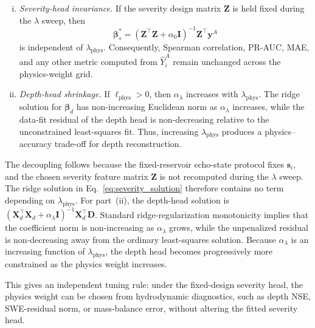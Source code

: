 \documentclass[pdflatex,sn-mathphys-ay]{sn-jnl}
\theoremstyle{thmstyleone}
\begin{document}
\begin{enumerate}[(i)]
  \item \emph{Severity-head invariance.}  If the severity design matrix
        $\mathbf{Z}$ is held fixed during the $\lambda$ sweep, then
        \begin{equation}
          \boldsymbol{\beta}_{s}^{*}
          =
          (\mathbf{Z}^{\top}\mathbf{Z}+
          \alpha_{0}\mathbf{I})^{-1}
          \mathbf{Z}^{\top}\mathbf{y}^{A}
          \label{eq:severity_solution}
        \end{equation}
        is independent of $\lambda_{\mathrm{phys}}$.  Consequently,
        Spearman correlation, PR-AUC, MAE, and any other metric
        computed from $\hat{Y}^{A}_{i}$ remain unchanged across the
        physics-weight grid.
  \item \emph{Depth-head shrinkage.}  If
        $\ell_{\mathrm{phys}}>0$, then $\alpha_{\lambda}$ increases
        with $\lambda_{\mathrm{phys}}$.  The ridge solution for
        $\boldsymbol{\beta}_{d}$ has non-increasing Euclidean norm as
        $\alpha_{\lambda}$ increases, while the data-fit residual of
        the depth head is non-decreasing relative to the unconstrained
        least-squares fit.  Thus, increasing
        $\lambda_{\mathrm{phys}}$ produces a physics--accuracy
        trade-off for depth reconstruction.
\end{enumerate}


The decoupling follows because the fixed-reservoir echo-state protocol fixes
$\mathbf{s}_{i}$, and the chosen severity feature matrix $\mathbf{Z}$ is
not recomputed during the $\lambda$ sweep.  The ridge solution in
Eq.~\eqref{eq:severity_solution} therefore contains no term depending
on $\lambda_{\mathrm{phys}}$.
For part~(ii), the depth-head solution is
$(\mathbf{X}_{d}^{\top}\mathbf{X}_{d}+\alpha_{\lambda}\mathbf{I})^{-1}
\mathbf{X}_{d}^{\top}\mathbf{D}$.  Standard ridge-regularization
monotonicity implies that the coefficient norm is non-increasing as
$\alpha_{\lambda}$ grows, while the unpenalized residual is
non-decreasing away from the ordinary least-squares solution.  Because
$\alpha_{\lambda}$ is an increasing function of
$\lambda_{\mathrm{phys}}$, the depth head becomes progressively more
constrained as the physics weight increases.

This gives an independent tuning rule: under the fixed-design severity
head, the physics weight can be chosen from hydrodynamic diagnostics,
such as depth NSE, SWE-residual norm, or mass-balance error, without
altering the fitted severity head.
\end{document}
